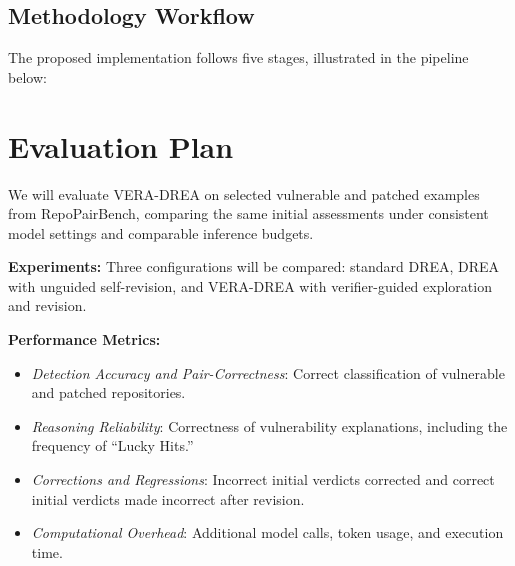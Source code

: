 \documentclass[sigconf,nonacm]{acmart}
\begin{document}
\subsection{Methodology Workflow}
The proposed implementation follows five stages, illustrated in the pipeline below:

\vspace{0.3cm}
\noindent{}
\vspace{0.3cm}

\section{Evaluation Plan}
We will evaluate VERA-DREA on selected vulnerable and patched examples from RepoPairBench, comparing the same initial assessments under consistent model settings and comparable inference budgets.

\textbf{Experiments:} Three configurations will be compared: standard DREA, DREA with unguided self-revision, and VERA-DREA with verifier-guided exploration and revision.

\textbf{Performance Metrics:}
\begin{itemize}
    \item \textit{Detection Accuracy and Pair-Correctness}: Correct classification of vulnerable and patched repositories.
    \item \textit{Reasoning Reliability}: Correctness of vulnerability explanations, including the frequency of ``Lucky Hits.''
    \item \textit{Corrections and Regressions}: Incorrect initial verdicts corrected and correct initial verdicts made incorrect after revision.
    \item \textit{Computational Overhead}: Additional model calls, token usage, and execution time.
\end{itemize}
\end{document}
